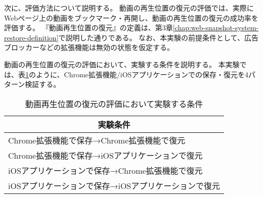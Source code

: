 次に、評価方法について説明する。
動画の再生位置の復元の評価では、実際にWebページ上の動画をブックマーク・再開し、動画の再生位置の復元の成功率を評価する。
『動画再生位置の復元』の定義は、第3章\ref{chap:web-snapshot-system-restore-definition}で説明した通りである。
なお、本実験の前提条件として、広告ブロッカーなどの拡張機能は無効の状態を仮定する。

動画の再生位置の復元の評価において、実験する条件を説明する。
本実験では、表\ref{tb:evl-video-audio-conditions}のように、Chrome拡張機能/iOSアプリケーションでの保存・復元を4パターン検証する。

\begin{table}[htbp]
  \label{tb:evl-video-audio-conditions}
  \caption{動画再生位置の復元の評価において実験する条件}
  \begin{center}
    \begin{tabular}{|l|}
    \hline
    \multicolumn{1}{|c|}{\textbf{実験条件}} \\\hline
    Chrome拡張機能で保存→Chrome拡張機能で復元 \\ \hline
    Chrome拡張機能で保存→iOSアプリケーションで復元 \\ \hline
    iOSアプリケーションで保存→Chrome拡張機能で復元 \\ \hline
    iOSアプリケーションで保存→iOSアプリケーションで復元 \\ \hline
    \end{tabular}
  \end{center}
\end{table}
